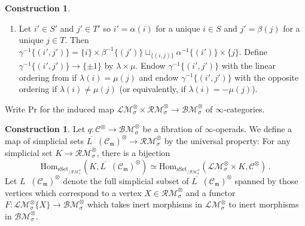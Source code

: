 \documentclass{article}
\DeclareMathOperator{\Modh}{{}^{\sigma}Mod} %
\theoremstyle{definition}
\newtheorem{construction}[equation]{Construction}
\begin{document}
\begin{construction}
\begin{enumerate}[label=(\arabic*)]
\begin{enumerate}[label=(\roman*)]
        \item Let $ i' \in S' $ and $ j' \in T' $ so $ i' = \alpha(i) $ for a unique $ i \in S $ and $ j' = \beta(j) $ for a unique $ j \in T $. 
        Then $ \gamma^{-1} \{(i',j')\} = \{i\} \times \beta^{-1}\{(j')\} \sqcup_{\{(i,j)\}} \alpha^{-1}\{(i')\} \times \{j\} $. 
        Define $ \gamma^{-1} \{(i',j')\} \to \{\pm 1\} $ by $ \lambda \times \mu $. 
        Endow $ \gamma^{-1} \{(i',j')\} $ with the linear ordering from \cite[Construction 4.3.2.1(2)(iv)]{LurHA} if $ \lambda(i) = \mu(j) $ and endow $ \gamma^{-1} \{(i',j')\} $ with the opposite ordering if $ \lambda(i) \neq \mu(j) $ (or equivalently, if $\lambda(i) = -\mu(j) $). 
    \end{enumerate}
\end{enumerate}
    Write $ \mathrm{Pr} $ for the induced map $ \mathcal{LM}^\otimes_\sigma \times \mathcal{RM}^\otimes_\sigma \to \mathcal{BM}^\otimes_\sigma $ of $ \infty $-categories. 
\end{construction}
\begin{construction}
    Let $ q \colon \mathcal{C}^\otimes \to \mathcal{BM}^\otimes_\sigma $ be a fibration of $ \infty $-operads. 
    We define a map of simplicial sets $ \overline{L\Modh}(\mathcal{C}_{\mathfrak{m}})^\otimes \to \mathcal{RM}^\otimes_\sigma $ by the universal property: For any simplicial set $ K \to \mathcal{RM}^\otimes_\sigma $, there is a bijection
    \begin{equation*}
        \mathrm{Hom}_{\mathrm{sSet}_{/\mathcal{RM}^\otimes_\sigma}}\left(K,\overline{L\Modh}(\mathcal{C}_{\mathfrak{m}})^\otimes \right) \simeq  \mathrm{Hom}_{\mathrm{sSet}_{/\mathcal{BM}^\otimes_\sigma}}\left(\mathcal{LM}^\otimes_\sigma \times K, \mathcal{C}^\otimes \right)\,.
    \end{equation*}
    Let $ L\Modh(\mathcal{C}_{\mathfrak{m}})^\otimes $ denote the full simplicial subset of $ \overline{L\Modh}(\mathcal{C}_{\mathfrak{m}})^\otimes $ spanned by those vertices which correspond to a vertex $ X \in \mathcal{RM}^\otimes_\sigma $ and a functor $ F \colon \mathcal{LM}^\otimes_\sigma \{X\} \to \mathcal{BM}^\otimes_\sigma $ which takes inert morphisms in $ \mathcal{LM}^\otimes_\sigma $ to inert morphisms in $ \mathcal{BM}^\otimes_\sigma $. 
\end{construction}
\end{document}

